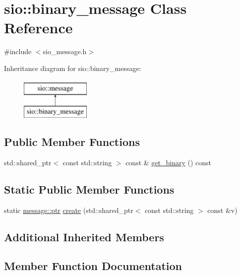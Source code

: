 \hypertarget{classsio_1_1binary__message}{}\section{sio\+:\+:binary\+\_\+message Class Reference}
\label{classsio_1_1binary__message}


{\ttfamily \#include $<$sio\+\_\+message.\+h$>$}

Inheritance diagram for sio\+:\+:binary\+\_\+message\+:\begin{figure}[H]
\begin{center}
\leavevmode
\includegraphics[height=2.000000cm]{classsio_1_1binary__message}
\end{center}
\end{figure}
\subsection*{Public Member Functions}
\begin{DoxyCompactItemize}
\item 
std\+::shared\+\_\+ptr$<$ const std\+::string $>$ const  \& \hyperlink{classsio_1_1binary__message_aac4db910fd9afb507ef0750394c5cd29}{get\+\_\+binary} () const
\end{DoxyCompactItemize}
\subsection*{Static Public Member Functions}
\begin{DoxyCompactItemize}
\item 
static \hyperlink{classsio_1_1message_a6340b6fef57e4516eb17928b1885a615}{message\+::ptr} \hyperlink{classsio_1_1binary__message_afd6bf4a5d9cd36a8082da4e4febfd60e}{create} (std\+::shared\+\_\+ptr$<$ const std\+::string $>$ const \&v)
\end{DoxyCompactItemize}
\subsection*{Additional Inherited Members}


\subsection{Member Function Documentation}
\mbox{\label{classsio_1_1binary__message_afd6bf4a5d9cd36a8082da4e4febfd60e}} 
